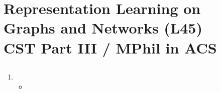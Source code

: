 \documentclass{article}
\author{Victor Zhao\\xz398@cam.ac.uk}
\begin{document}
\centering
\section*{Representation Learning on Graphs and Networks (L45)\\CST Part III / MPhil in ACS}
\MyAuthor

\justifying

\subsection{}

\begin{enumerate}
	\item 
	\begin{itemize}[topsep=0pt]
		\item 
	\end{itemize}
\end{enumerate}
\end{document}
